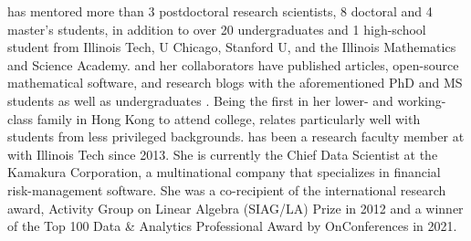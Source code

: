 has mentored more than 3 postdoctoral research scientists, 8 doctoral and 4 master’s students, in addition to over 20 undergraduates and 1 high-school student from Illinois Tech, U Chicago, Stanford U, and the Illinois Mathematics and Science Academy. \SCTC and her collaborators have published articles, open-source mathematical software, and research blogs with the aforementioned PhD and MS students \cite{ChoEtal22a,QMCPy2020a,QMCBlog,
ChoEtal20a,WCCR18,ChoEtal17a} as well as undergraduates \cite{QMCPy2020a,QMCBlog,PCLD21,ZLWC21}. Being the first in her lower- and working-class family in Hong Kong to attend college, \SCTC relates particularly well with students from less privileged backgrounds. \SCTC has been a research faculty member at with Illinois Tech since 2013. She is currently the Chief Data Scientist at the Kamakura Corporation, a multinational company that specializes in financial risk-management software.  She was a co-recipient of the international research award, \SIAM Activity Group on Linear Algebra (SIAG/LA) Prize in 2012 and  a winner of the Top 100 Data \& Analytics Professional Award by OnConferences in 2021. 

